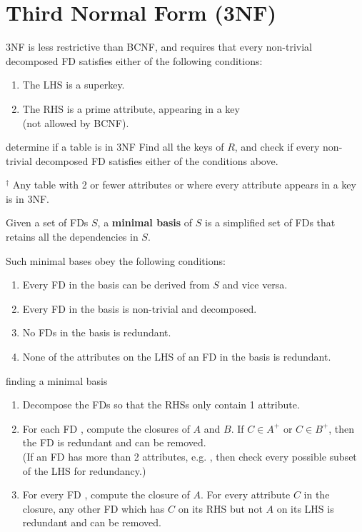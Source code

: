\section{Third Normal Form (3NF)}
3NF is less restrictive than BCNF, and requires that every non-trivial decomposed FD satisfies either of the following conditions:

\begin{enumerate}
    \item The LHS is a superkey.
    \item The RHS is a prime attribute, appearing in a key \\ (not allowed by BCNF).
\end{enumerate}

\begin{defn}{determine if a table is in 3NF}
    Find all the keys of $R$, and check if every non-trivial decomposed FD satisfies either of the conditions above.

    $^\dagger$ Any table with 2 or fewer attributes or where every attribute appears in a key is in 3NF.
\end{defn}

Given a set of FDs $S$, a \textbf{minimal basis} of $S$ is a simplified set of FDs that retains all the dependencies in $S$.

Such minimal bases obey the following conditions:
\begin{enumerate}
    \item Every FD in the basis can be derived from $S$ and vice versa.
    \item Every FD in the basis is non-trivial and decomposed.
    \item No FDs in the basis is redundant.
    \item None of the attributes on the LHS of an FD in the basis is redundant.
\end{enumerate}

\begin{defn*}{finding a minimal basis}
    \begin{enumerate}
        \item Decompose the FDs so that the RHSs only contain 1 attribute.
        \item For each FD , compute the closures of $A$ and $B$. If $C \in A^+$ or $C \in B^+$, then the FD is redundant and can be removed. \\ (If an FD has more than 2 attributes, e.g. , then check every possible subset of the LHS for redundancy.)
        \item For every FD , compute the closure of $A$. For every attribute $C$ in the closure, any other FD which has $C$ on its RHS but not $A$ on its LHS is redundant and can be removed.
    \end{enumerate}
\end{defn*}

